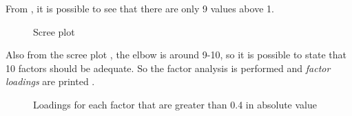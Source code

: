 From , it is possible to see that there are only 9 values above 1.

\begin{figure}[H]
    \label{fig:scree}
    \caption{Scree plot} 
\end{figure}

Also from the scree plot , the elbow is around 9-10, so it is possible to state that 10 factors should be adequate.
So the factor analysis is performed and \textit{factor loadings} are printed .

\begin{figure}[H]
    \label{fig:loadings}
    \caption{Loadings for each factor that are greater than 0.4 in absolute value} 
\end{figure}

